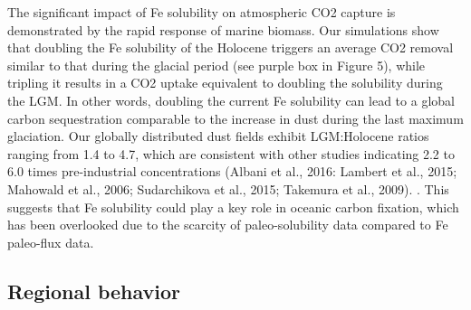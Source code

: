 The significant impact of Fe solubility on atmospheric CO2 capture is demonstrated by the rapid response of marine biomass. Our simulations show that doubling the Fe solubility of the Holocene triggers an average CO2 removal similar to that during the glacial period (see purple box in Figure 5), while tripling it results in a CO2 uptake equivalent to doubling the solubility during the LGM. In other words, doubling the current Fe solubility can lead to a global carbon sequestration comparable to the increase in dust during the last maximum glaciation. Our globally distributed dust fields exhibit LGM:Holocene ratios ranging from 1.4 to 4.7, which are consistent with other studies indicating 2.2 to 6.0 times pre-industrial concentrations (Albani et al., 2016: Lambert et al., 2015; Mahowald et al., 2006; Sudarchikova et al., 2015; Takemura et al., 2009). . This suggests that Fe solubility could play a key role in oceanic carbon fixation, which has been overlooked due to the scarcity of paleo-solubility data compared to Fe paleo-flux data. 

\subsection{Regional behavior}

